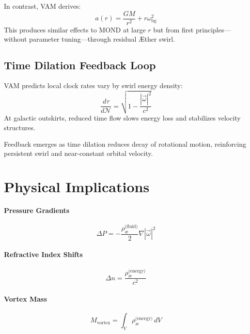 \documentclass[12pt]{article}
\begin{document}
    In contrast, VAM derives:
    \[
        a(r) = \frac{G M}{r^2} + r \omega_{\text{bg}}^2
    \]
    This produces similar effects to MOND at large $r$ but from first principles—without parameter tuning—through residual \AE{}ther swirl.

    \subsection{Time Dilation Feedback Loop}

    VAM predicts local clock rates vary by swirl energy density:
    \[
        \frac{d\tau}{d\mathcal{N}} = \sqrt{1 - \frac{|\vec{\omega}|^2}{c^2}}
    \]
    At galactic outskirts, reduced time flow slows energy loss and stabilizes velocity structures.

    Feedback emerges as time dilation reduces decay of rotational motion, reinforcing persistent swirl and near-constant orbital velocity.

    \section{Physical Implications}

    \paragraph{Pressure Gradients}
    \[
        \Delta P = -\frac{\rho_{\text{\ae}}^{\text{(fluid)}}}{2} \nabla |\vec{\omega}|^2
    \]

    \paragraph{Refractive Index Shifts}
    \[
        \Delta n = \frac{\rho_{\text{\ae}}^{\text{(energy)}}}{c^2}
    \]

    \paragraph{Vortex Mass}
    \[
        M_{\text{vortex}} = \int_V \rho_{\text{\ae}}^{\text{(energy)}} \, dV
    \]
\end{document}
